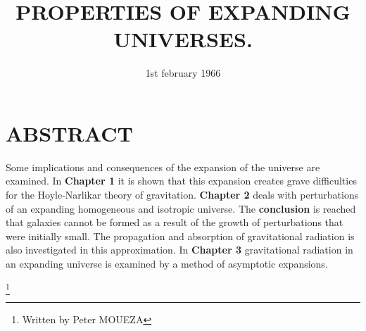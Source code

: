 \documentclass{article}
\title{\textbf{PROPERTIES OF EXPANDING UNIVERSES.}}
\date{1st february 1966}
\begin{document}



\part{\textbf{ABSTRACT}}


Some implications and consequences of the expansion of the universe are examined. In \textbf{Chapter 1} it is shown that this expansion creates grave difficulties for the Hoyle-Narlikar theory of gravitation. \textbf{Chapter 2} deals with perturbations of an expanding homogeneous and isotropic universe. The \textbf{conclusion} is reached that galaxies cannot be formed as a result of the growth of perturbations that were initially small. The propagation and absorption of gravitational radiation is also investigated in this approximation. In  \textbf{Chapter 3} gravitational radiation in an expanding universe is examined by a method of asymptotic expansions.




\footnote{Written by Peter MOUEZA}
\end{document}
